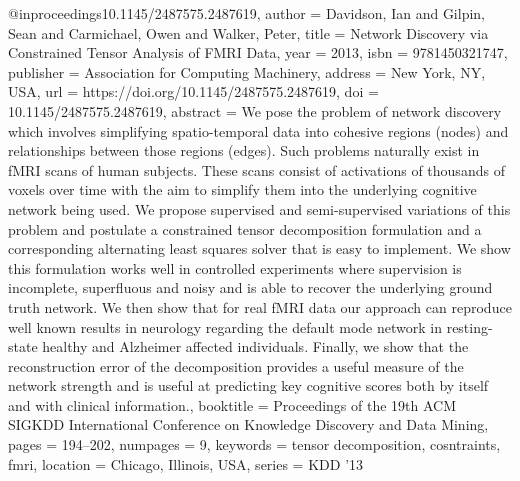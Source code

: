 @inproceedings{10.1145/2487575.2487619,
author = {Davidson, Ian and Gilpin, Sean and Carmichael, Owen and Walker, Peter},
title = {Network Discovery via Constrained Tensor Analysis of FMRI Data},
year = {2013},
isbn = {9781450321747},
publisher = {Association for Computing Machinery},
address = {New York, NY, USA},
url = {https://doi.org/10.1145/2487575.2487619},
doi = {10.1145/2487575.2487619},
abstract = {We pose the problem of network discovery which involves simplifying spatio-temporal data into cohesive regions (nodes) and relationships between those regions (edges). Such problems naturally exist in fMRI scans of human subjects. These scans consist of activations of thousands of voxels over time with the aim to simplify them into the underlying cognitive network being used. We propose supervised and semi-supervised variations of this problem and postulate a constrained tensor decomposition formulation and a corresponding alternating least squares solver that is easy to implement. We show this formulation works well in controlled experiments where supervision is incomplete, superfluous and noisy and is able to recover the underlying ground truth network. We then show that for real fMRI data our approach can reproduce well known results in neurology regarding the default mode network in resting-state healthy and Alzheimer affected individuals. Finally, we show that the reconstruction error of the decomposition provides a useful measure of the network strength and is useful at predicting key cognitive scores both by itself and with clinical information.},
booktitle = {Proceedings of the 19th ACM SIGKDD International Conference on Knowledge Discovery and Data Mining},
pages = {194–202},
numpages = {9},
keywords = {tensor decomposition, cosntraints, fmri},
location = {Chicago, Illinois, USA},
series = {KDD '13}
}